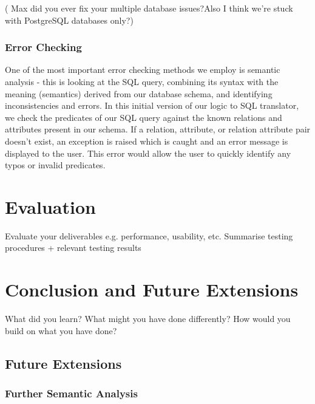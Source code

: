 \documentclass[a4paper, 11pt]{article}
\begin{document}
      ( Max did you ever fix your multiple database issues?Also I think we're
      stuck with PostgreSQL databases only?) 

      \subsubsection{Error Checking}


      One of the most important error checking methods we employ is semantic
      analysis - this is looking at the SQL query, combining its syntax with
      the meaning (semantics) derived from our database schema, and identifying
      inconsistencies and errors. In this initial version of our logic to SQL
      translator, we check the predicates of our SQL query against the known
      relations and attributes present in our schema. If a relation, attribute,
      or relation attribute pair doesn't exist, an exception is raised which is
      caught and an error message is displayed to the user. This error would
      allow the user to quickly identify any typos or invalid predicates.


\section{Evaluation}
  Evaluate your deliverables e.g. performance, usability, etc.
  Summarise testing procedures + relevant testing results

\section{Conclusion and Future Extensions}
  What did you learn? What might you have done differently?
  How would you build on what you have done?

  \subsection{Future Extensions}

    \subsubsection{Further Semantic Analysis}
\end{document}
